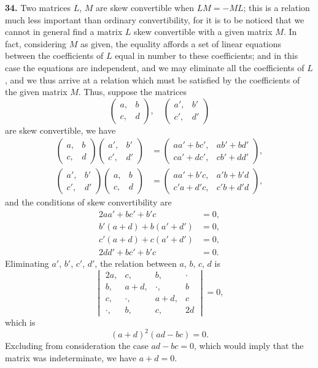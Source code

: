 \documentclass[12pt,a4paper]{article}
\theoremstyle{definition}
\begin{document}
\medskip
\noindent\textbf{34.} Two matrices $L$, $M$ are skew convertible when $LM = -ML$; this is a relation much less important than ordinary convertibility, for it is to be noticed that we cannot in general find a matrix $L$ skew convertible with a given matrix $M$. In fact, considering $M$ as given, the equality affords a set of linear equations between the coefficients of $L$ equal in number to these coefficients; and in this case the equations are independent, and we may eliminate all the coefficients of $L$, and we thus arrive at a relation which must be satisfied by the coefficients of the given matrix $M$. Thus, suppose the matrices
\[
\begin{pmatrix} a, & b \\ c, & d \end{pmatrix},\quad
\begin{pmatrix} a', & b' \\ c', & d' \end{pmatrix}
\]
are skew convertible, we have
\begin{align*}
\begin{pmatrix} a, & b \\ c, & d \end{pmatrix}
\begin{pmatrix} a', & b' \\ c', & d' \end{pmatrix}
&= \begin{pmatrix} aa'+bc', & ab'+bd' \\ ca'+dc', & cb'+dd' \end{pmatrix}, \\
\begin{pmatrix} a', & b' \\ c', & d' \end{pmatrix}
\begin{pmatrix} a, & b \\ c, & d \end{pmatrix}
&= \begin{pmatrix} aa'+b'c, & a'b+b'd \\ c'a+d'c, & c'b+d'd \end{pmatrix},
\end{align*}
and the conditions of skew convertibility are
\begin{align*}
2aa'+bc'+b'c &= 0, \\
b'(a+d)+b(a'+d') &= 0, \\
c'(a+d)+c(a'+d') &= 0, \\
2dd'+bc'+b'c &= 0.
\end{align*}
Eliminating $a'$, $b'$, $c'$, $d'$, the relation between $a$, $b$, $c$, $d$ is
\[
\begin{vmatrix}
2a, & c, & b, & \cdot \\
b, & a+d, & \cdot, & b \\
c, & \cdot, & a+d, & c \\
\cdot, & b, & c, & 2d
\end{vmatrix} = 0,
\]
which is
\[(a+d)^2(ad-bc) = 0.\]
Excluding from consideration the case $ad-bc=0$, which would imply that the matrix was indeterminate, we have $a+d=0$.
\end{document}
